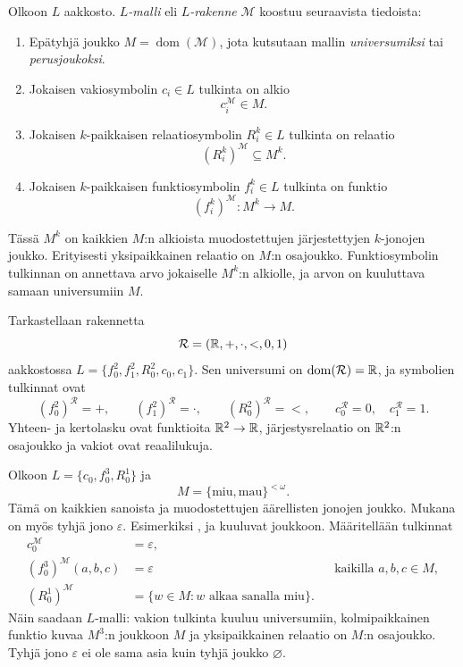 \documentclass[11pt,a4paper]{amsart}
\begin{document}
\begin{definition}[$L$-malli]
  Olkoon $L$ aakkosto. \emph{$L$-malli} eli \emph{$L$-rakenne}
  $\mathcal M$ koostuu seuraavista tiedoista:
  \begin{enumerate}[label=(\roman*)]
    \item Epätyhjä joukko $M=\operatorname{dom}(\mathcal M)$, jota kutsutaan
      mallin \emph{universumiksi} tai \emph{perusjoukoksi}.
    \item Jokaisen vakiosymbolin $c_i\in L$ tulkinta on alkio
      \[
        c_i^{\mathcal M}\in M.
      \]
    \item Jokaisen $k$-paikkaisen relaatiosymbolin $R_i^k\in L$ tulkinta
      on relaatio
      \[
        (R_i^k)^{\mathcal M}\subseteq M^k.
      \]
    \item Jokaisen $k$-paikkaisen funktiosymbolin $f_i^k\in L$ tulkinta
      on funktio
      \[
        (f_i^k)^{\mathcal M}\colon M^k\longrightarrow M.
      \]
  \end{enumerate}
\end{definition}

Tässä $M^k$ on kaikkien $M$:n alkioista muodostettujen järjestettyjen
$k$-jonojen joukko. Erityisesti yksipaikkainen relaatio on $M$:n
osajoukko. Funktiosymbolin tulkinnan on annettava arvo jokaiselle
$M^k$:n alkiolle, ja arvon on kuuluttava samaan universumiin $M$.

\begin{example}
  Tarkastellaan rakennetta
  \[
    \mathcal R=(\mathbb{R},+,\cdot,<,0,1)
  \]
  aakkostossa $L=\{f_0^2,f_1^2,R_0^2,c_0,c_1\}$. Sen universumi on
  $\operatorname{dom}(\mathcal R)=\mathbb{R}$, ja symbolien tulkinnat ovat
  \[
    (f_0^2)^{\mathcal R}=+,\qquad
    (f_1^2)^{\mathcal R}=\cdot,\qquad
    (R_0^2)^{\mathcal R}=<,\qquad
    c_0^{\mathcal R}=0,\quad c_1^{\mathcal R}=1.
  \]
  Yhteen- ja kertolasku ovat funktioita $\mathbb{R}^2\to\mathbb{R}$,
  järjestysrelaatio on $\mathbb{R}^2$:n osajoukko ja vakiot ovat reaalilukuja.
\end{example}

\newpage
\begin{example}
  Olkoon $L=\{c_0,f_0^3,R_0^1\}$ ja
  \[
    M=\{\text{miu},\text{mau}\}^{<\omega}.
  \]
  Tämä on kaikkien sanoista  ja  muodostettujen
  äärellisten jonojen joukko. Mukana on myös tyhjä jono $\varepsilon$.
  Esimerkiksi ,  ja  kuuluvat joukkoon.
  Määritellään tulkinnat
  \begin{align*}
    c_0^{\mathcal M}&=\varepsilon,\\
    (f_0^3)^{\mathcal M}(a,b,c)&=\varepsilon
    &&\text{kaikilla }a,b,c\in M,\\
    (R_0^1)^{\mathcal M}&=\{w\in M : w\text{ alkaa sanalla miu}\}.
  \end{align*}
  Näin saadaan $L$-malli: vakion tulkinta kuuluu universumiin,
  kolmipaikkainen funktio kuvaa $M^3$:n joukkoon $M$ ja yksipaikkainen
  relaatio on $M$:n osajoukko. Tyhjä jono $\varepsilon$ ei ole sama asia
  kuin tyhjä joukko $\varnothing$.
\end{example}
\end{document}
